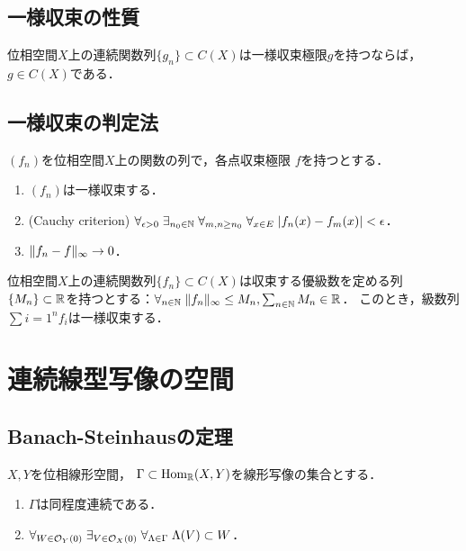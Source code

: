 \documentclass[uplatex,dvipdfmx]{jsreport}
\begin{document}
\subsection{一様収束の性質}

\begin{proposition}
    位相空間$X$上の連続関数列$\{g_n\}\subset C(X)$は一様収束極限$g$を持つならば，$g\in C(X)$である．
\end{proposition}

\subsection{一様収束の判定法}

\begin{proposition}[一様収束の判定法]
    $(f_n)$を位相空間$X$上の関数の列で，各点収束極限
    $f$を持つとする．
    \begin{enumerate}
        \item $(f_n)$は一様収束する．
        \item (Cauchy criterion) $\forall_{\epsilon>0}\;\exists_{n_0\in\mathbb{N}}\;\forall_{m,n\ge n_0}\;\forall_{x\in E}\;\lvert f_n(x)-f_m(x)\rvert<\epsilon$．
        \item $\|f_n-f\|_\infty\to0$．
    \end{enumerate}
\end{proposition}

\begin{proposition}
    位相空間$X$上の連続関数列$\{f_n\}\subset C(X)$は収束する優級数を定める列$\{M_n\}\subset\mathbb{R}$を持つとする：$\forall_{n\in\mathbb{N}}\;\|f_n\|_\infty\le M_n,\sum_{n\in\mathbb{N}}M_n\in\mathbb{R}$．
    このとき，級数列$\sum{i=1}^nf_i$は一様収束する．
\end{proposition}

\section{連続線型写像の空間}

\subsection{Banach-Steinhausの定理}

\begin{proposition}[同程度連続性の特徴付け]
    $X,Y$を位相線形空間，
    $\Gamma\subset\mathrm{Hom}_{\mathbb{R}}(X,Y)$を線形写像の集合とする．
    \begin{enumerate}
        \item $\Gamma$は同程度連続である．
        \item $\forall_{W\in\mathcal{O}_Y(0)}\;\exists_{V\in\mathcal{O}_X(0)}\;\forall_{\Lambda\in\Gamma}\;\Lambda(V)\subset W$．
    \end{enumerate}
\end{proposition}
\end{document}
